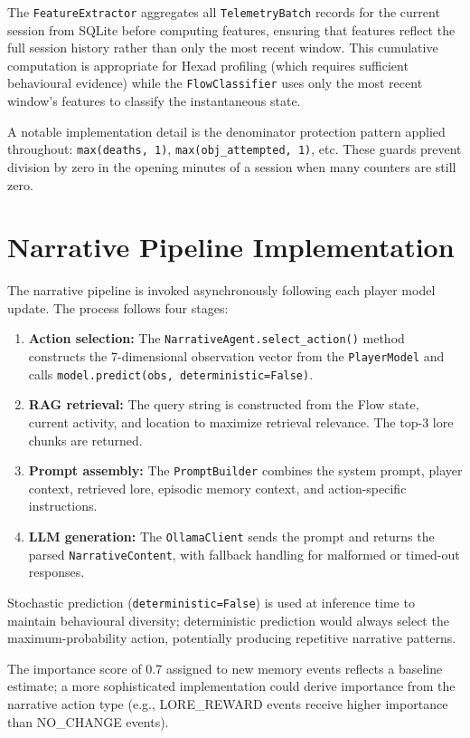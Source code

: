 \documentclass[12pt,a4paper]{report}
\begin{document}
The \texttt{FeatureExtractor} aggregates all \texttt{TelemetryBatch} records for the current session from SQLite before computing features, ensuring that features reflect the full session history rather than only the most recent window. This cumulative computation is appropriate for Hexad profiling (which requires sufficient behavioural evidence) while the \texttt{FlowClassifier} uses only the most recent window's features to classify the instantaneous state.

A notable implementation detail is the denominator protection pattern applied throughout: \texttt{max(deaths, 1)}, \texttt{max(obj\_attempted, 1)}, etc. These guards prevent division by zero in the opening minutes of a session when many counters are still zero.

\section{Narrative Pipeline Implementation}

The narrative pipeline is invoked asynchronously following each player model update. The process follows four stages:

\begin{enumerate}
\item \textbf{Action selection:} The \texttt{NarrativeAgent.select\_action()} method constructs the 7-dimensional observation vector from the \texttt{PlayerModel} and calls \texttt{model.predict(obs, deterministic=False)}.
\item \textbf{RAG retrieval:} The query string is constructed from the Flow state, current activity, and location to maximize retrieval relevance. The top-3 lore chunks are returned.
\item \textbf{Prompt assembly:} The \texttt{PromptBuilder} combines the system prompt, player context, retrieved lore, episodic memory context, and action-specific instructions.
\item \textbf{LLM generation:} The \texttt{OllamaClient} sends the prompt and returns the parsed \texttt{NarrativeContent}, with fallback handling for malformed or timed-out responses.
\end{enumerate}

Stochastic prediction (\texttt{deterministic=False}) is used at inference time to maintain behavioural diversity; deterministic prediction would always select the maximum-probability action, potentially producing repetitive narrative patterns.

The importance score of 0.7 assigned to new memory events reflects a baseline estimate; a more sophisticated implementation could derive importance from the narrative action type (e.g., LORE\_REWARD events receive higher importance than NO\_CHANGE events).
\end{document}

